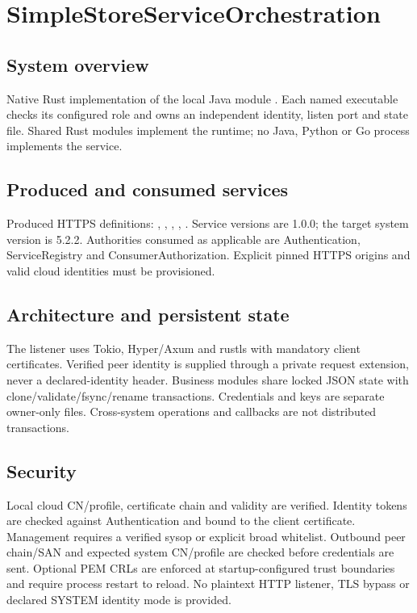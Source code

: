 \documentclass[a4paper]{arrowhead}
\begin{document}
\section{SimpleStoreServiceOrchestration}
\subsection{System overview}
Native Rust implementation of the local Java module . Each named executable checks its configured role and owns an independent identity, listen port and state file. Shared Rust modules implement the runtime; no Java, Python or Go process implements the service.
\subsection{Produced and consumed services}
Produced HTTPS definitions: , \allowbreak {}, \allowbreak {}, \allowbreak {}, \allowbreak {}. Service versions are 1.0.0; the target system version is 5.2.2. Authorities consumed as applicable are Authentication, ServiceRegistry and ConsumerAuthorization. Explicit pinned HTTPS origins and valid cloud identities must be provisioned.
\subsection{Architecture and persistent state}
The listener uses Tokio, Hyper/Axum and rustls with mandatory client certificates. Verified peer identity is supplied through a private request extension, never a declared-identity header. Business modules share locked JSON state with clone/validate/fsync/rename transactions. Credentials and keys are separate owner-only files. Cross-system operations and callbacks are not distributed transactions.
\subsection{Security}
Local cloud CN/profile, certificate chain and validity are verified. Identity tokens are checked against Authentication and bound to the client certificate. Management requires a verified sysop or explicit broad whitelist. Outbound peer chain/SAN and expected system CN/profile are checked before credentials are sent. Optional PEM CRLs are enforced at startup-configured trust boundaries and require process restart to reload. No plaintext HTTP listener, TLS bypass or declared SYSTEM identity mode is provided.
\end{document}
